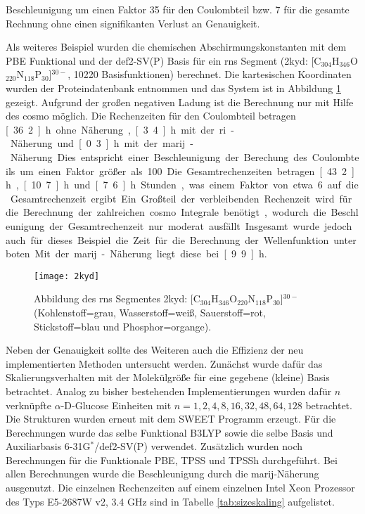 Beschleunigung um einen Faktor 35 für den Coulombteil bzw. 7 für die gesamte Rechnung ohne einen signifikanten Verlust an Genauigkeit. 

Als weiteres Beispiel wurden die chemischen Abschirmungskonstanten mit dem PBE Funktional und der def2-SV(P) Basis für ein \ac{rns} Segment (2kyd\supercite{2kydstructure}: [C$_{304}$H$_{346}$O$_{220}$N$_{118}$P$_{30}$]$^{30-}$, 10220 Basisfunktionen) berechnet. Die kartesischen Koordinaten wurden der Proteindatenbank entnommen und das System ist in Abbildung \ref{abb:2kyd} gezeigt. Aufgrund der großen negativen Ladung ist die Berechnung nur mit Hilfe des \ac{cosmo} möglich. Die Rechenzeiten für den Coulombteil betragen \unit[36.2]{h} ohne Näherung, \unit[3.4]{h} mit der \ac{ri}-Näherung und \unit[0.3]{h} mit der \ac{marij}-Näherung. Dies entspricht einer Beschleunigung der Berechung des Coulombteils um einen Faktor größer als 100. Die Gesamtrechenzeiten betragen \unit[43.2]{h}, \unit[10.7]{h} und \unit[7.6]{h} Stunden, was einem Faktor von etwa 6 auf die Gesamtrechenzeit ergibt. Ein Großteil der verbleibenden Rechenzeit wird für die Berechnung der zahlreichen \ac{cosmo} Integrale benötigt, wodurch die Beschleunigung der Gesamtrechenzeit nur moderat ausfällt. Insgesamt wurde jedoch auch für dieses Beispiel die Zeit für die Berechnung der Wellenfunktion unterboten. Mit der \ac{marij}-Näherung liegt diese bei \unit[9.9]{h}.

\begin{figure}[ht!]
	\centering
	\texttt{[image: 2kyd]}
	\captionsetup{figurewithin = chapter}
	\captionsetup{font=small, labelfont=bf}\caption[{Abbildung eines \ac{rns} Segmentes}]{Abbildung des \ac{rns} Segmentes 2kyd\supercite{2kydstructure}: [C$_{304}$H$_{346}$O$_{220}$N$_{118}$P$_{30}$]$^{30-}$ (Kohlenstoff=grau, Wasserstoff=weiß, Sauerstoff=rot, Stickstoff=blau und Phosphor=organge).}
\label{abb:2kyd}
\end{figure}

\bigskip
Neben der Genauigkeit sollte des Weiteren auch die Effizienz der neu implementierten Methoden untersucht werden. Zunächst wurde dafür das Skalierungsverhalten mit der Molekülgröße für eine gegebene (kleine) Basis betrachtet. Analog zu bisher bestehenden Implementierungen\supercite{beer2011nuclei,kumar2016nuclei} wurden dafür $n$ verknüpfte $\alpha$-D-Glucose Einheiten mit $n=1,2,4,8,16,32,48,64,128$ betrachtet. Die Strukturen wurden erneut mit dem SWEET Programm erzeugt. Für die Berechnungen wurde das selbe Funktional B3LYP\supercite{becke1993density,lee1988development,stephens1994ab} sowie die selbe Basis und Auxiliarbasis 6-31G$^*$\supercite{hariharan1973influence}/def2-SV(P) verwendet. Zusätzlich wurden noch Berechnungen für die Funktionale PBE, TPSS und TPSSh durchgeführt. Bei allen Berechnungen wurde die Beschleunigung durch die \ac{marij}-Näherung ausgenutzt. Die einzelnen Rechenzeiten auf einem einzelnen Intel\textsuperscript{\textregistered} Xeon\textsuperscript{\textregistered} Prozessor des Typs E5-2687W v2, 3.4 GHz sind in Tabelle \ref{tab:sizeskaling} aufgelistet. 

